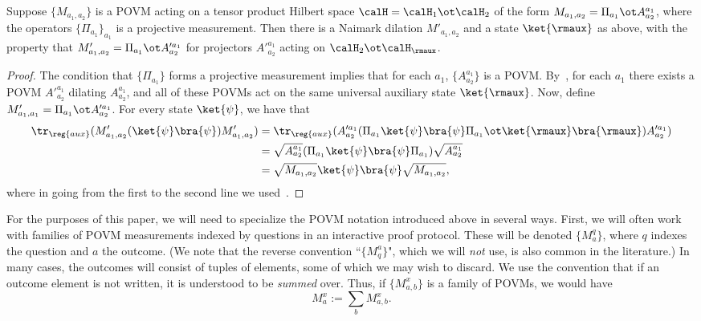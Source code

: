   \begin{theorem}\label{thm:partial-naimark}
    Suppose $\{M_{a_1, a_2}\}$ is a POVM acting on a tensor product
  Hilbert space $\calH = \calH_1 \ot \calH_2$ of the form $M_{a_1,
    a_2} = \Pi_{a_1} \ot A^{a_1}_{a_2}$, where the operators $\{\Pi_{a_1}\}_{a_1}$ is a
  projective measurement. Then there is a Naimark dilation $M'_{a_1,
    a_2}$ and a state $\ket{\rmaux}$ as above, with the property that
  $M'_{a_1, a_2} = \Pi_{a_1} \ot A'^{a_1}_{a_2}$ for projectors
  $A'^{a_1}_{a_2}$ acting on $\calH_2 \ot \calH_{\rmaux}$.
\end{theorem}
\begin{proof}
  The condition that $\{\Pi_{a_1}\}$ forms a projective measurement
  implies that for each $a_1$, $\{A^{a_1}_{a_2}\}$ is a
  POVM. By~, for each $a_1$ there exists a POVM
  $A'^{a_1}_{a_2}$ dilating $A^{a_1}_{a_2}$, and all of these POVMs
  act on the same universal auxiliary state $\ket{\rmaux}$. Now,
  define $M'_{a_1, a_1} = \Pi_{a_1} \ot A'^{a_1}_{a_2}$. For every
  state $\ket{\psi}$, we have that
  \begin{align*}
    \tr_{\reg{aux}}(M'_{a_1, a_2} (\ket{\psi}\bra{\psi}) M'_{a_1,
    a_2}) &= \tr_{\reg{aux}}( A'^{a_1}_{a_2} (\Pi_{a_1} \ket{\psi}
            \bra{\psi} \Pi_{a_1} \ot \ket{\rmaux} \bra{\rmaux}) A'^{a_1}_{a_2}) \\
          &= \sqrt{A^{a_1}_{a_2}} (\Pi_{a_1} \ket{\psi} \bra{\psi}
            \Pi_{a_1}) \sqrt{A^{a_1}_{a_2}} \\
          &= \sqrt{M_{a_1, a_2}} \ket{\psi} \bra{\psi} \sqrt{M_{a_1,
            a_2}},
  \end{align*}
  where in going from the first to the second line we used~.
\end{proof}


For the purposes of this paper, we will need to specialize the POVM
notation introduced above in several ways. First, we will often work
with families of POVM measurements indexed by questions in an
interactive proof protocol. These will be denoted $\{M^q_a\}$, where
$q$ indexes the question and $a$ the outcome.
(We note that the reverse convention ``$\{M_q^a\}$", which we will \emph{not} use, is also common in the literature.)
In many cases, the outcomes will consist of
tuples of elements, some of which we may wish to discard. We use the
convention that if an outcome element is not written, it
is understood to be \emph{summed} over. Thus, if $\{M^{x}_{a,b}\}$
is a family of POVMs, we would have
\begin{equation}\label{eq:spider-man}
M^{x}_{a} := \sum_b M^{x}_{a,b}.
\end{equation}

